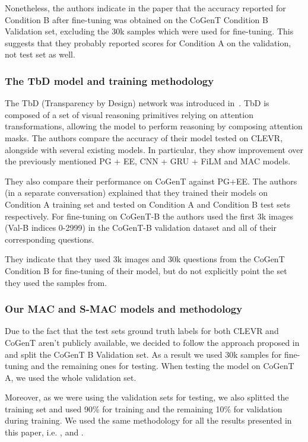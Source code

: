 Nonetheless, the authors indicate in the paper that the accuracy reported for Condition B after fine-tuning was obtained on the CoGenT Condition B Validation set, excluding the 30k samples which were used for fine-tuning.
This suggests that they probably reported scores for Condition A on the validation, not test set as well.


\subsubsection{The TbD model and training methodology}

The TbD (Transparency by Design) network was introduced in~\cite{mascharka2018transparency}.
TbD is composed of a set of visual reasoning primitives relying on attention transformations, allowing the model to perform reasoning by composing attention masks.
The authors compare the accuracy of their model tested on CLEVR, alongside with several existing models. In particular, they show improvement over the previously mentioned PG + EE, CNN + GRU + FiLM and MAC models.

They also compare their performance on CoGenT against PG+EE.
The authors (in a separate conversation) explained that they trained their models on Condition A training set and tested on Condition A and Condition B test sets respectively.
For fine-tuning on CoGenT-B the authors used the first 3k images (Val-B indices 0-2999) in the CoGenT-B validation dataset and all of their corresponding questions.



They indicate that they used 3k images and 30k questions from the CoGenT Condition B for fine-tuning of their model, but do not explicitly point the set they used the samples from.


\subsubsection{Our MAC and S-MAC models and methodology}

Due to the fact that the test sets ground truth labels for both CLEVR and CoGenT aren't publicly available, we decided to follow the approach proposed in~\cite{perez2017film} and split the CoGenT B Validation set.
As a result we used 30k samples for fine-tuning and the remaining ones for testing.
When testing the model on CoGenT A, we used the whole validation set.

Moreover, as we were using the validation sets for testing, we also splitted the training set and used 90\% for training and the remaining 10\% for validation during training.
We used the same methodology for all the results presented in this paper, i.e. ,  and .
